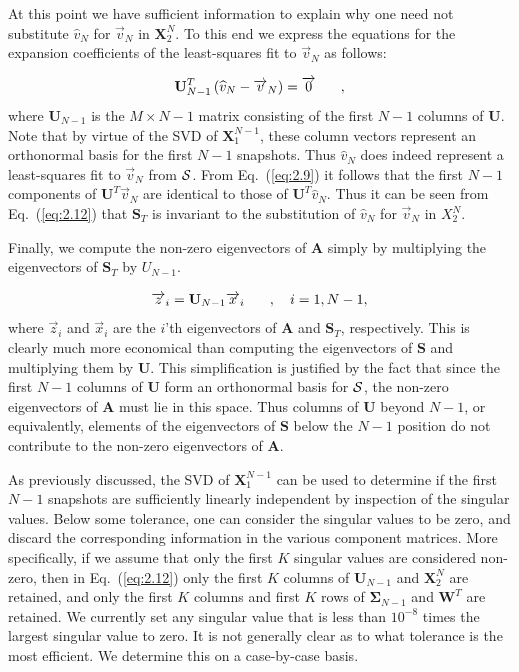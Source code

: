 \documentclass[12pt]{article}
\newcommand{\fn}[1]{\left( #1 \right)}
\renewcommand{\vec}[1]{\overrightarrow{#1}}
\newcommand{\be}{\begin{equation}}
\newcommand{\ee}{\end{equation}}
\newcommand{\pec}{\hspace{0.25in},}
\newcommand{\LEQ}[1]{\label{eq:#1}}
\newcommand{\EQ}[1]{Eq.~(\ref{eq:#1})}
\newcommand{\cS}{{\cal S}}
\newcommand{\mA}{\mathbf{A}}
\newcommand{\mX}{\mathbf{X}}
\newcommand{\mU}{\mathbf{U}}
\newcommand{\mW}{\mathbf{W}}
\newcommand{\mSigma}{\mathbf{\Sigma}}
\newcommand{\mS}{\mathbf{S}}
\begin{document}
At this point we have sufficient information to explain why one need not 
	substitute $\widehat{v}_N$ for $\vec{v}_N$ in $\mX_2^{N}$.  
To this end we express the equations for the expansion coefficients of the 
	least-squares fit to $\vec{v}_N$ as follows:

\be
	\mU^T_{N-1}\fn{\widehat{v}_N - \vec{v}_N} = \vec{0} \pec
	\LEQ{2.9}
\ee
where $\mU_{N-1}$ is the $M \times N-1$ matrix consisting of the first $N-1$ 
	columns of $\mU$. 
Note that by virtue of the SVD of $\mX_{1}^{N-1}$, these column vectors 
	represent an orthonormal basis for the first $N-1$ snapshots.  
Thus $\widehat{v}_N$ does indeed represent a least-squares fit to $\vec{v}_N$
	from $\cS$.  
From \EQ{2.9} it follows that the first $N-1$ components of $\mU^T \vec{v}_N$ 
	are identical to those of $\mU^T \widehat{v}_N$. 
Thus it can be seen from \EQ{2.12} that $\mS_T$ is invariant to the 
	substitution of $\widehat{v}_N$ for $\vec{v}_N$ in $X_{2}^{N}$.

Finally, we compute the non-zero eigenvectors of $\mA$ simply by multiplying 
	the eigenvectors of $\mS_T$ by $U_{N-1}$. 

\be
	\vec{z}_i = \mU_{N-1} \vec{x}_i \pec \quad i=1,N-1,
	\LEQ{2.13}
\ee
where $\vec{z}_i$ and $\vec{x}_i$ are the $i$'th eigenvectors of $\mA$ and 
	$\mS_T$, respectively.  
This is clearly much more economical than computing the eigenvectors of $\mS$ 
	and multiplying them by $\mU$.  
This simplification is justified by the fact that since the first $N-1$ columns 
	of $\mU$ form an orthonormal basis for $\cS$, the non-zero eigenvectors of 
	$\mA$ must lie in this space.  
Thus columns of $\mU$ beyond $N-1$, or equivalently, elements of the  
	eigenvectors of $\mS$ below the $N-1$ position do not contribute to the 
	non-zero eigenvectors of $\mA$. 

As previously discussed, the SVD of $\mX_{1}^{N-1}$ can be used to determine if 
	the first $N-1$ snapshots are sufficiently linearly independent by inspection 
	of the singular values.  
Below some tolerance, one can consider the singular values to be zero, and 
	discard the corresponding information in the various component matrices. 
More specifically, if we assume that only the first $K$ singular values are 
	considered non-zero, then in \EQ{2.12} only the first $K$ columns of 
	$\mU_{N-1}$ and $\mX_{2}^{N}$ are retained, and only the first $K$ columns 
	and first $K$ rows of $\mSigma_{N-1}$ and $\mW^T$ are retained.  
We currently set any singular value that is less than $10^{-8}$ times the 
	largest singular value to zero. 
It is not generally clear as to what tolerance is the most efficient.  
We determine this on a case-by-case basis.
\end{document}
